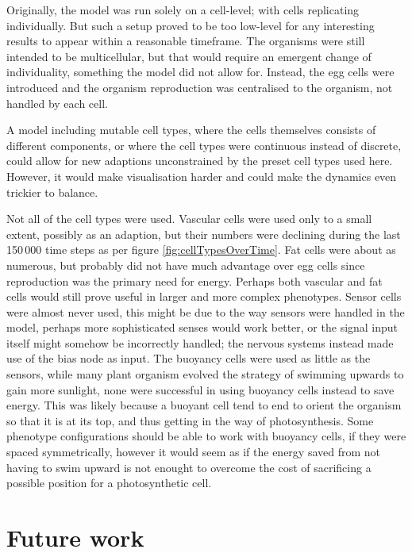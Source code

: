 Originally, the model was run solely on a cell-level; with cells replicating individually. But such a setup proved to be too low-level for any interesting results to appear within a reasonable timeframe. The organisms were still intended to be multicellular, but that would require an emergent change of individuality, something the model did not allow for. Instead, the egg cells were introduced and the organism reproduction was centralised to the organism, not handled by each cell.

A model including mutable cell types, where the cells themselves consists of different components, or where the cell types were continuous instead of discrete, could allow for new adaptions unconstrained by the preset cell types used here. However, it would make visualisation harder and could make the dynamics even trickier to balance.

Not all of the cell types were used. Vascular cells were used only to a small extent, possibly as an adaption, but their numbers were declining during the last 150\,000 time steps as per figure \ref{fig:cellTypesOverTime}. Fat cells were about as numerous, but probably did not have much advantage over egg cells since reproduction was the primary need for energy. Perhaps both vascular and fat cells would still prove useful in larger and more complex phenotypes. Sensor cells were almost never used, this might be due to the way sensors were handled in the model, perhaps more sophisticated senses would work better, or the signal input itself might somehow be incorrectly handled; the nervous systems instead made use of the bias node as input. The buoyancy cells were used as little as the sensors, while many plant organism evolved the strategy of swimming upwards to gain more sunlight, none were successful in using buoyancy cells instead to save energy. This was likely because a buoyant cell tend to end to orient the organism so that it is at its top, and thus getting in the way of photosynthesis. Some phenotype configurations should be able to work with buoyancy cells, if they were spaced symmetrically, however it would seem as if the energy saved from not having to swim upward is not enought to overcome the cost of sacrificing a possible position for a photosynthetic cell.

\section{Future work} %

